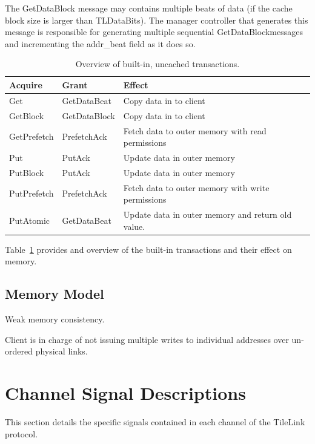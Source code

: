 The GetDataBlock message may contains multiple beats of data (if the cache block size is larger than TLDataBits).
The manager controller that generates this message is responsible for generating multiple sequential GetDataBlockmessages and incrementing the addr\_beat field as it does so.

\begin{table}[ht]
\begin{center}
\begin{tabular}{|l|l|l|}
    \hline
    Acquire & Grant & Effect \\ \hline \hline
    Get & GetDataBeat & Copy data in to client \\ \hline
    GetBlock & GetDataBlock & Copy data in to client \\ \hline
    GetPrefetch & PrefetchAck & Fetch data to outer memory with read permissions \\ \hline
    Put & PutAck & Update data in outer memory \\ \hline
    PutBlock & PutAck & Update data in outer memory \\ \hline
    PutPrefetch & PrefetchAck & Fetch data to outer memory with write permissions \\ \hline
    PutAtomic & GetDataBeat & Update data in outer memory and return old value. \\ \hline
\end{tabular}
\end{center}
\caption{Overview of built-in, uncached transactions.}
\label{tab:uncached}
\end{table}

Table~\ref{tab:uncached} provides and overview of the built-in transactions and their effect on memory.
 
\subsection{Memory Model}

Weak memory consistency.

Client is in charge of not issuing multiple writes to individual addresses over un-ordered physical links.

\section{Channel Signal Descriptions}

This section details the specific signals contained in each channel of the TileLink protocol.

